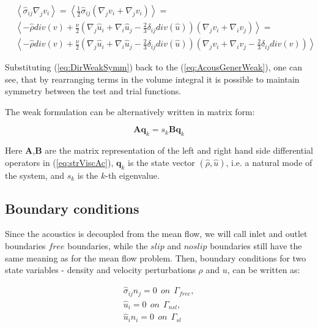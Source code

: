 \begin{subequations}
\begin{align}
        &\left<\hat{\sigma}_{ij} \nabla_j v_i \right> = \left<\frac{1}{2}\hat{\sigma}_{ij} (\nabla_j v_i + \nabla_j v_i) \right>  = \\
        &\left<- \hat{\rho} div(v) +  \frac{\nu}{2} \left( \nabla_j \hat{u}_i + \nabla_i \hat{u}_j - \frac{2}{3} \delta_{ij} div(\hat{u}) \right) (\nabla_j v_i + \nabla_i v_j) \right> = \\
        \label{eq:DirWeakSymm}
        &\left<- \hat{\rho} div(v) +  \frac{\nu}{2} \left( \nabla_j \hat{u}_i + \nabla_i \hat{u}_j - \frac{2}{3} \delta_{ij} div(\hat{u}) \right) (\nabla_j v_i + \nabla_i v_j - \frac{2}{3} \delta_{ij} div(v) ) \right>
\end{align}
\end{subequations}

Substituting (\ref{eq:DirWeakSymm}) back to the (\ref{eq:AcousGenerWeak}), one can see, that by rearranging terms in the volume integral it is possible to maintain symmetry between the test and trial functions.

The weak formulation can be alternatively written in matrix form:

\begin{equation}
    \mathbf{A}\mathbf{q}_k = s_k \mathbf{B}\mathbf{q}_k
\end{equation}

Here \textbf{A},\textbf{B} are the matrix representation of the left and right  hand  side  differential  operators in (\ref{eq:strViscAc}),  $\mathbf{q}_k$ is the state vector $(\hat{\rho}, \hat{u})$, i.e. a natural mode of the system, and $s_k$ is  the $k$-th eigenvalue. 



\subsection{Boundary conditions}

Since the acoustics is decoupled from the mean flow, we will call inlet and outlet boundaries $free$ boundaries, while the $slip$ and $no slip$ boundaries still have the same meaning as for the mean flow problem. Then, boundary conditions for two state variables - density and velocity perturbations $\rho$ and $u$, can be written as:

\begin{subequations}
\begin{align}
    \hat{\sigma}_{ij} n_j  = 0 \ \ on  \ \ \Gamma_{free}, \\
    \hat{u}_i = 0 \ \ on \ \ \Gamma_{nsl},\\
    \hat{u}_i n_i = 0 \ \ on \ \ \Gamma_{sl}
\end{align}
\end{subequations}

